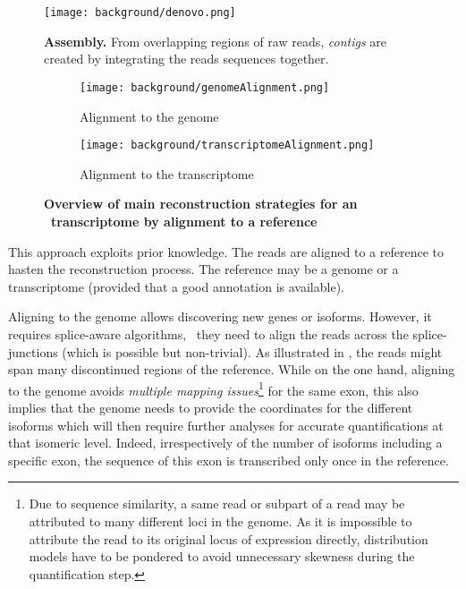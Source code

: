 \begin{figure}
    \texttt{[image: background/denovo.png]}\centering
    \caption[\textit{de novo} Assembly]{\label{fig:denovo}\textbf{
    Assembly.} From overlapping regions of raw reads, \emph{contigs} are
    created by integrating the reads sequences together.}
\end{figure}

\begin{figure}
    \centering
    \begin{subfigure}{1.1\textwidth}\label{fig:genoAlignment}
        \texttt{[image: background/genomeAlignment.png]}\centering
        \caption{Alignment to the genome}
    \end{subfigure}

    \begin{subfigure}{1.1\textwidth}\label{fig:transAlignment}
        \texttt{[image: background/transcriptomeAlignment.png]}\centering
        \caption{Alignment to the transcriptome}
    \end{subfigure}
    \caption[Overview of main alignment strategies for \Rnaseq\
    transcriptome]{\label{fig:OverviewRnaseqMapping}\textbf{Overview of main
    reconstruction strategies for an \Rnaseq\ transcriptome by alignment to a
    reference}}
\end{figure}


This approach exploits prior knowledge. The reads are aligned to a reference to
hasten the reconstruction process. The reference may be a genome or a
transcriptome (provided that a good annotation is available).


Aligning to the genome allows discovering new genes or isoforms. However, it
requires splice-aware algorithms, \ie\ they need to align the
reads across the splice-junctions (which is possible but non-trivial).
As illustrated in \Cref{fig:genoAlignment},
the reads might span many discontinued regions of the reference.
While on the one hand, aligning to the genome avoids \emph{multiple mapping
issues}\footnote{Due to sequence similarity, a same read or subpart of a read
may be attributed to many different loci in the genome. As it is
impossible to attribute the read to its original locus of expression directly,
distribution models have to be pondered to avoid unnecessary skewness during
the quantification step.} for the same exon, this also implies that
the genome needs to provide the coordinates for the different isoforms
which will then require further analyses for accurate quantifications at that
isomeric level.
Indeed, irrespectively of the number of isoforms including a specific exon,
the sequence of this exon is transcribed only once in the reference.


